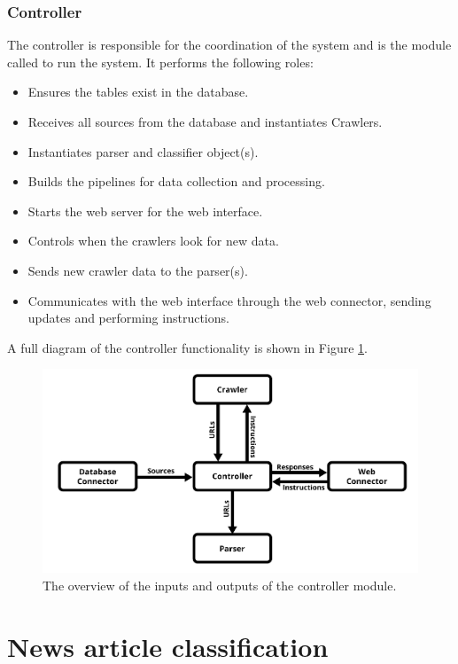 \documentclass{l4proj}
\begin{document}
\subsection{Controller}
The controller is responsible for the coordination of the system and is the module called to run the system. It performs the following roles:
\begin{itemize}
    \item Ensures the tables exist in the database.
    \item Receives all sources from the database and instantiates Crawlers.
    \item Instantiates parser and classifier object(s).
    \item Builds the pipelines for data collection and processing.
    \item Starts the web server for the web interface.
    \item Controls when the crawlers look for new data.
    \item Sends new crawler data to the parser(s).
    \item Communicates with the web interface through the web connector, sending updates and performing instructions.
\end{itemize}
A full diagram of the controller functionality is shown in Figure \ref{fig:controller_diagram}.
 \begin{figure}[h]
\centering
\includegraphics[width=\textwidth]{images/Controller-diagram.png}
\caption{The overview of the inputs and outputs of the controller module.}
\label{fig:controller_diagram}
\end{figure}


\chapter{News article classification}
\end{document}
